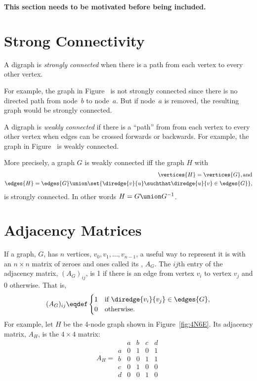 \begin{editingnotes}

\textbf{This section needs to be motivated before being included.}

\section{Strong Connectivity}

\begin{definition}
A digraph is \emph{strongly connected}%
when there is a path from each vertex to every other vertex.
\end{definition}

For example, the graph in Figure~%
is not strongly connected since there is no directed path from
node~$b$ to node~$a$.  But if node~$a$ is removed, the resulting graph
would be strongly connected.

A digraph is \emph{weakly connected}%
\iffalse or, more simply,
\emph{connected})\fi if there is a ``path'' from from each vertex to
every other vertex when edges can be crossed forwards or backwards.
For example, the graph in Figure~%
is weakly connected.

More precisely, a graph $G$ is weakly connected iff the graph $H$ with
\begin{align*}
\vertices{H} = \vertices{G}, \text{and}\\
\edges{H} = \edges{G} \union \set{\diredge{v}{u} \suchthat \diredge{u}{v} \in \edges{G}},
\end{align*}
is strongly connected.  In other words $H = G \union G^{-1}$.
\end{editingnotes}


\section{Adjacency Matrices}\label{sec:adjacency-matrix-digraph}
If a graph, $G$, has $n$ vertices, $v_0,v_1,\dots, v_{n-1}$, a useful
way to represent it is with an $n \times n$ matrix of zeroes and ones
called its , $A_G$.  The $ij$th
entry of the adjacency matrix,  $(A_G)_{ij}$, is 1 if there is an edge
from vertex $v_i$ to vertex $v_j$ and 0 otherwise.  That is,
\[
(A_G)_{ij} \eqdef \begin{cases} 1 & \text{if } \diredge{v_i}{v_j} \in
  \edges{G},\\
0 & \text{otherwise}.
\end{cases}
\]
For example, let $H$ be the 4-node graph shown in
Figure~\ref{fig:4N6E}.  Its adjacency matrix, $A_H$, is the $4 \times
4$ matrix:
\[
A_H =\begin{array}{c|cccc|}
  &  a & b & c & d \\ \hline
a &  0 & 1 & 0 & 1 \\
b &  0 & 0 & 1 & 1 \\
c &  0 & 1 & 0 & 0 \\
d &  0 & 0 & 1 & 0
\end{array}
\]

